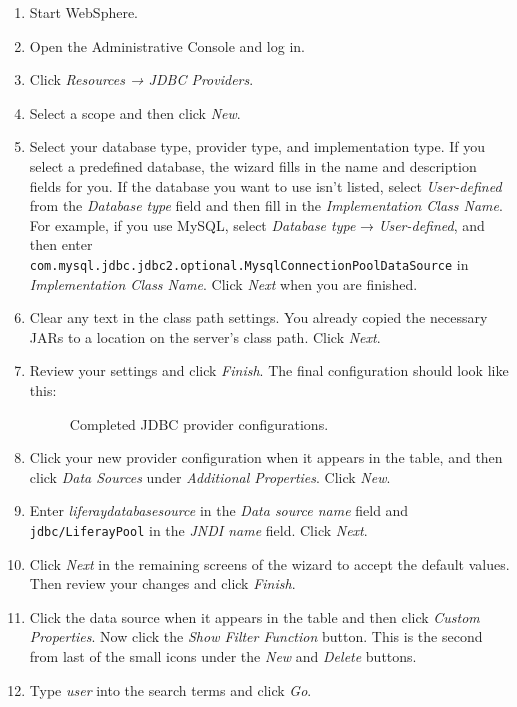 \begin{enumerate}
\def\labelenumi{\arabic{enumi}.}
\item
  Start WebSphere.
\item
  Open the Administrative Console and log in.
\item
  Click \emph{Resources → JDBC Providers}.
\item
  Select a scope and then click \emph{New}.
\item
  Select your database type, provider type, and implementation type. If
  you select a predefined database, the wizard fills in the name and
  description fields for you. If the database you want to use isn't
  listed, select \emph{User-defined} from the \emph{Database type} field
  and then fill in the \emph{Implementation Class Name}. For example, if
  you use MySQL, select \emph{Database type} → \emph{User-defined}, and
  then enter
  \texttt{com.mysql.jdbc.jdbc2.optional.MysqlConnectionPoolDataSource}
  in \emph{Implementation Class Name}. Click \emph{Next} when you are
  finished.
\item
  Clear any text in the class path settings. You already copied the
  necessary JARs to a location on the server's class path. Click
  \emph{Next}.
\item
  Review your settings and click \emph{Finish}. The final configuration
  should look like this:

  \begin{figure}
  \centering
  \caption{Completed JDBC provider configurations.}
  \end{figure}
\item
  Click your new provider configuration when it appears in the table,
  and then click \emph{Data Sources} under \emph{Additional Properties}.
  Click \emph{New}.
\item
  Enter \emph{liferaydatabasesource} in the \emph{Data source name}
  field and \texttt{jdbc/LiferayPool} in the \emph{JNDI name} field.
  Click \emph{Next}.
\item
  Click \emph{Next} in the remaining screens of the wizard to accept the
  default values. Then review your changes and click \emph{Finish}.
\item
  Click the data source when it appears in the table and then click
  \emph{Custom Properties}. Now click the \emph{Show Filter Function}
  button. This is the second from last of the small icons under the
  \emph{New} and \emph{Delete} buttons.
\item
  Type \emph{user} into the search terms and click \emph{Go}.


\end{enumerate}
